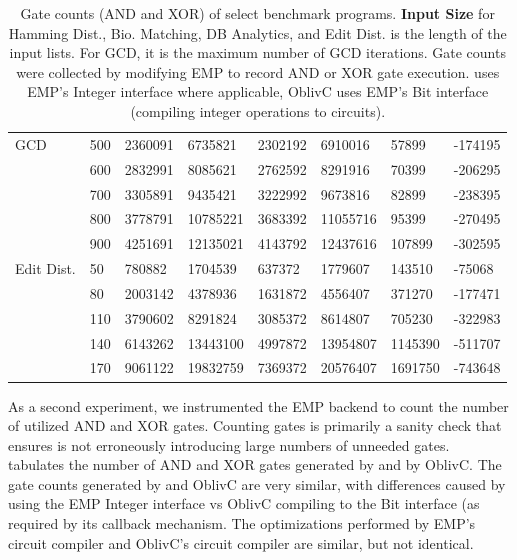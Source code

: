 \begin{table}
\begin{tabular}{ l l l l l l l l }
\hline
GCD           & 500   & 2360091  & 6735821  & 2302192  & 6910016  & 57899   & -174195  \\
              & 600   & 2832991  & 8085621  & 2762592  & 8291916  & 70399   & -206295  \\
              & 700   & 3305891  & 9435421  & 3222992  & 9673816  & 82899   & -238395  \\
              & 800   & 3778791  & 10785221 & 3683392  & 11055716 & 95399   & -270495  \\
              & 900   & 4251691  & 12135021 & 4143792  & 12437616 & 107899  & -302595  \\
\hline
Edit Dist.    & 50    & 780882   & 1704539  & 637372   & 1779607  & 143510  & -75068   \\
              & 80    & 2003142  & 4378936  & 1631872  & 4556407  & 371270  & -177471  \\
              & 110   & 3790602  & 8291824  & 3085372  & 8614807  & 705230  & -322983  \\
              & 140   & 6143262  & 13443100 & 4997872  & 13954807 & 1145390 & -511707  \\
              & 170   & 9061122  & 19832759 & 7369372  & 20576407 & 1691750 & -743648  \\
\hline
\end{tabular}
\caption{%
  \textnormal{
  Gate counts (AND and XOR) of select benchmark programs. \textbf{Input Size} for Hamming Dist.,
  Bio. Matching, DB Analytics, and Edit Dist. is the length of the input lists. For GCD, it is
  the maximum number of GCD iterations. Gate counts were collected by modifying EMP to record
  AND or XOR gate execution. \system{} uses EMP's Integer interface where applicable,
  OblivC uses EMP's Bit interface (compiling integer operations to circuits).
  }
}
\label{tab:mpc-impl-eval-gates}
\end{table}

As a second experiment, we instrumented the EMP backend to count the number of utilized AND and XOR gates.
Counting gates is primarily a sanity check that ensures \system is not
erroneously introducing large numbers of unneeded gates.
~ tabulates the number of
AND and XOR gates generated by \system{} and by OblivC.
The gate counts generated by \system{} and
OblivC are very similar, with differences caused by using the EMP
Integer interface vs OblivC compiling to the Bit interface (as
required by its callback mechanism. The optimizations
performed by EMP's circuit compiler and OblivC's circuit compiler are similar,
but not identical.

